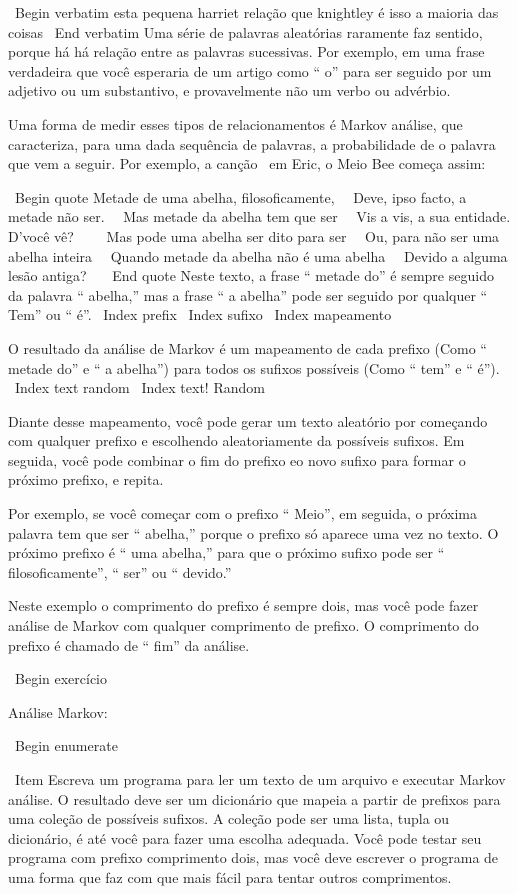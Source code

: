 \documentclass[10pt]{book}
\begin{document}
{{{{{{{{{\ Begin {verbatim}
esta pequena harriet relação que knightley é isso a maioria das coisas
\ End {verbatim}
%
Uma série de palavras aleatórias raramente faz sentido, porque há
há relação entre as palavras sucessivas. Por exemplo, em
uma frase verdadeira que você esperaria de um artigo como `` o'' para
ser seguido por um adjetivo ou um substantivo, e provavelmente não um verbo
ou advérbio.

Uma forma de medir esses tipos de relacionamentos é Markov
análise, que
caracteriza, para uma dada sequência de palavras, a probabilidade de o
palavra que vem a seguir. Por exemplo, a canção {\ em Eric, o Meio
  Bee} começa assim:

\ Begin {quote}
Metade de uma abelha, filosoficamente, \ \
Deve, ipso facto, a metade não ser. \ \
Mas metade da abelha tem que ser \ \
Vis a vis, a sua entidade. D'você vê? \ \
\ \
Mas pode uma abelha ser dito para ser \ \
Ou, para não ser uma abelha inteira \ \
Quando metade da abelha não é uma abelha \ \
Devido a alguma lesão antiga? \ \
\ End {quote}
%
Neste texto,
a frase `` metade do'' é sempre seguido da palavra `` abelha,''
mas a frase `` a abelha'' pode ser seguido por qualquer
`` Tem'' ou `` é''.
\ Index {prefix}
\ Index {sufixo}
\ Index {mapeamento}

O resultado da análise de Markov é um mapeamento de cada prefixo
(Como `` metade do'' e `` a abelha'') para todos os sufixos possíveis
(Como `` tem'' e `` é'').
\ Index {text random}
\ Index {text! Random}

Diante desse mapeamento, você pode gerar um texto aleatório por
começando com qualquer prefixo e escolhendo aleatoriamente da
possíveis sufixos. Em seguida, você pode combinar o fim do
prefixo eo novo sufixo para formar o próximo prefixo, e repita.

Por exemplo, se você começar com o prefixo `` Meio'', em seguida, o
próxima palavra tem que ser `` abelha,'' porque o prefixo só aparece
uma vez no texto. O próximo prefixo é `` uma abelha,'' para que o
próximo sufixo pode ser `` filosoficamente'', `` ser'' ou `` devido.''

Neste exemplo o comprimento do prefixo é sempre dois, mas
você pode fazer análise de Markov com qualquer comprimento de prefixo. O comprimento
do prefixo é chamado de `` fim'' da análise.

\ Begin {} exercício

Análise Markov:

\ Begin {enumerate}

\ Item Escreva um programa para ler um texto de um arquivo e executar Markov
análise. O resultado deve ser um dicionário que mapeia a partir de
prefixos para uma coleção de possíveis sufixos. A coleção
pode ser uma lista, tupla ou dicionário, é até você para fazer
uma escolha adequada. Você pode testar seu programa com prefixo
comprimento dois, mas você deve escrever o programa de uma forma que faz com que
mais fácil para tentar outros comprimentos.

}}}}}}}}}
\end{document}
